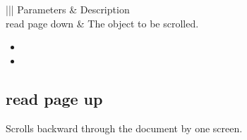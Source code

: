\documentclass[letterpaper,12pt,english,openany,oneside]{sphinxmanual}
\begin{document}
\begin{savenotes}\sphinxattablestart
\centering
{}\label{\detokenize{IAC_API_AppleEvtObjects:section-48}}\nobreak
\begin{tabular}[t]{|||}
\hline
\sphinxstyletheadfamily 
Parameters
&\sphinxstyletheadfamily 
Description
\\
\hline
read page down
&
The  object to be scrolled.
\\
\hline
\end{tabular}
\par
\sphinxattableend\end{savenotes}
\label{\detokenize{IAC_API_AppleEvtObjects:related-events-20}}
\begin{itemize}
\item {} 

\item {} 

\end{itemize}
\label{\detokenize{IAC_API_AppleEvtObjects:applescript-example-29}}

\begin{sphinxVerbatim}[commandchars=\\\{\}]
     
\end{sphinxVerbatim}
\label{\detokenize{IAC_API_AppleEvtObjects:apple-event-id-20}}

\begin{sphinxVerbatim}[commandchars=\\\{\}]
 
\end{sphinxVerbatim}




\subsection{read page up}
\label{\detokenize{IAC_API_AppleEvtObjects:read-page-up}}
Scrolls backward through the document by one screen.

\label{\detokenize{IAC_API_AppleEvtObjects:syntax-33}}
\end{document}
